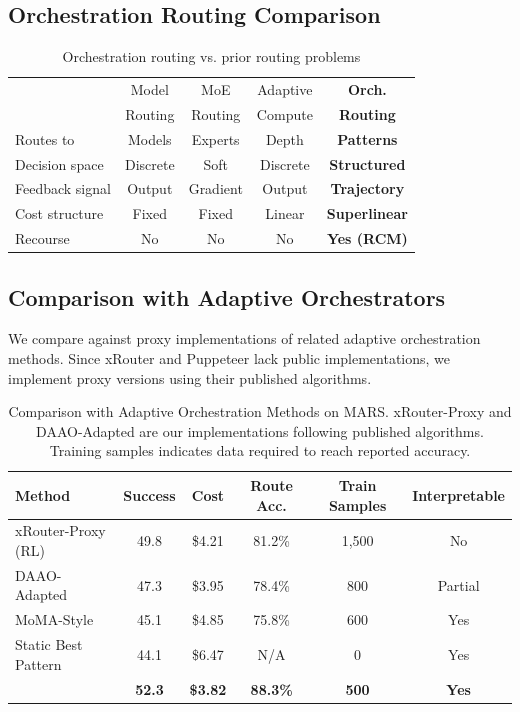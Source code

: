 \documentclass{article}
\theoremstyle{plain}
\theoremstyle{definition}
\theoremstyle{remark}
\begin{document}
\subsection{Orchestration Routing Comparison}
\begin{table}[h]
	\centering
	\caption{Orchestration routing vs. prior routing problems}
	\small
	\setlength{\tabcolsep}{3.4pt}
	\begin{tabular}{lcccc}
		\toprule
		& Model & MoE & Adaptive & \textbf{Orch.} \\
		& Routing & Routing & Compute & \textbf{Routing} \\
		\midrule
		Routes to & Models & Experts & Depth & \textbf{Patterns} \\
		Decision space & Discrete & Soft & Discrete & \textbf{Structured} \\
		Feedback signal & Output & Gradient & Output & \textbf{Trajectory} \\
		Cost structure & Fixed & Fixed & Linear & \textbf{Superlinear} \\
		Recourse & No & No & No & \textbf{Yes (RCM)} \\
		\bottomrule
	\end{tabular}
	\label{tab:routing_comparison}
\end{table}

\subsection{Comparison with Adaptive Orchestrators}
\label{sec:adaptive_comparison}

We compare \amore{} against proxy implementations of related adaptive orchestration methods. Since xRouter and Puppeteer lack public implementations, we implement proxy versions using their published algorithms.

\begin{table}[h]
	\caption{Comparison with Adaptive Orchestration Methods on MARS. xRouter-Proxy and DAAO-Adapted are our implementations following published algorithms. Training samples indicates data required to reach reported accuracy.}
	\label{tab:adaptive_comparison}
	\centering
	\small
	\begin{tabular}{@{}lccccc@{}}
		\toprule
		\textbf{Method} & \textbf{Success} & \textbf{Cost} & \textbf{Route Acc.} & \textbf{Train Samples} & \textbf{Interpretable} \\
		\midrule
		xRouter-Proxy (RL) & 49.8 & \$4.21 & 81.2\% & 1,500 & No \\
		DAAO-Adapted & 47.3 & \$3.95 & 78.4\% & 800 & Partial \\
		MoMA-Style & 45.1 & \$4.85 & 75.8\% & 600 & Yes \\
		Static Best Pattern & 44.1 & \$6.47 & N/A & 0 & Yes \\
		\textbf{\amore{}} & \textbf{52.3} & \textbf{\$3.82} & \textbf{88.3\%} & \textbf{500} & \textbf{Yes} \\
		\bottomrule
	\end{tabular}
\end{table}
\end{document}
